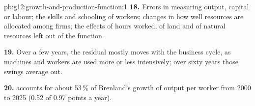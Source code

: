 \begin{solution}{pb:g12:growth-and-production-function:1}
\textbf{18.} Errors in measuring output, capital or labour; the skills and schooling of workers; changes in how well resources are allocated among firms; the effects of
hours worked, of land and of natural resources left out of the function.

\textbf{19.} Over a few years, the residual mostly moves with the business cycle, as machines and workers are used more or less intensively; over sixty years those
swings average out.

\textbf{20.}  accounts for about 53\,\% of Brenland's growth of output per worker from 2000 to 2025 (0.52 of 0.97 points a year).
\end{solution}
